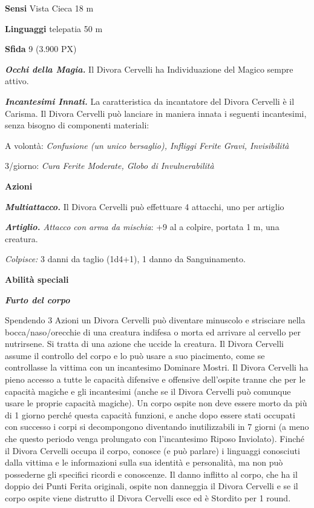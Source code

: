 \begin{multicols}{2}
	\textbf{Sensi} Vista Cieca 18 m

	\textbf{Linguaggi} telepatia 50 m

	\textbf{Sfida} 9 (3.900 PX)

	\textit{\textbf{Occhi della Magia.}} Il Divora Cervelli ha Individuazione del Magico sempre attivo.

	\textit{\textbf{Incantesimi Innati.}} La caratteristica da incantatore del Divora Cervelli è il Carisma. Il Divora Cervelli può lanciare in maniera innata i seguenti incantesimi, senza bisogno di componenti materiali:

	A volontà: \textit{Confusione (un unico bersaglio), Infliggi Ferite Gravi, Invisibilità}

	3/giorno: \textit{Cura Ferite Moderate, Globo di Invulnerabilità}

	\textbf{Azioni}

	\textit{\textbf{Multiattacco.}} Il Divora Cervelli può effettuare 4 attacchi, uno per artiglio

	\textit{\textbf{Artiglio.} Attacco con arma da mischia}: +9 al a colpire, portata 1 m, una creatura.

	\textit{Colpisce:} 3 danni da taglio (1d4+1), 1 danno da Sanguinamento.

	\textbf{Abilità speciali}

	\textit{\textbf{Furto del corpo}}

	Spendendo 3 Azioni un Divora Cervelli può diventare minuscolo e strisciare nella bocca/naso/orecchie di una creatura indifesa o morta ed arrivare al cervello per nutrirsene. Si tratta di una azione che uccide la creatura. Il Divora Cervelli assume il controllo del corpo e lo può usare a suo piacimento, come se controllasse la vittima con un incantesimo Dominare Mostri. Il Divora Cervelli ha pieno accesso a tutte le capacità difensive e offensive dell’ospite tranne che per le capacità magiche e gli incantesimi (anche se il Divora Cervelli può comunque usare le proprie capacità magiche). Un corpo ospite non deve essere morto da più di 1 giorno perché questa capacità funzioni, e anche dopo essere stati occupati con successo i corpi si decompongono diventando inutilizzabili in 7 giorni (a meno che questo periodo venga prolungato con l'incantesimo Riposo Inviolato). Finché il Divora Cervelli occupa il corpo, conosce (e può parlare) i linguaggi conosciuti dalla vittima e le informazioni sulla sua identità e personalità, ma non può possederne gli specifici ricordi e conoscenze. Il danno inflitto al corpo, che ha il doppio dei Punti Ferita originali, ospite non danneggia il Divora Cervelli e se il corpo ospite viene distrutto il Divora Cervelli esce ed è Stordito per 1 round.


\end{multicols}
